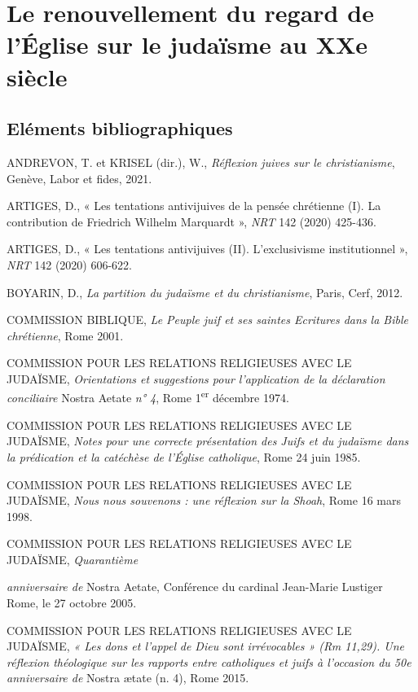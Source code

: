 
\chapter{Le renouvellement du regard de l'Église sur le judaïsme au XXe siècle}

\hypertarget{eluxe9ments-bibliographiques}{%
\section{Eléments bibliographiques}\label{eluxe9ments-bibliographiques}}


ANDREVON, T. et KRISEL (dir.), W., \emph{Réflexion juives sur le
christianisme}, Genève, Labor et fides, 2021.

ARTIGES, D., « Les tentations antivijuives de la pensée chrétienne (I).
La contribution de Friedrich Wilhelm Marquardt », \emph{NRT} 142 (2020)
425-436.

ARTIGES, D., « Les tentations antivijuives (II). L'exclusivisme
institutionnel », \emph{NRT} 142 (2020) 606-622.

BOYARIN, D., \emph{La partition du judaïsme et du christianisme}, Paris,
Cerf, 2012.

COMMISSION BIBLIQUE, \emph{Le Peuple juif et ses saintes Ecritures dans
la Bible chrétienne}, Rome 2001.

COMMISSION POUR LES RELATIONS RELIGIEUSES AVEC LE JUDAÏSME,
\emph{Orientations et}
\emph{suggestions pour l'application de la déclaration conciliaire}
Nostra Aetate \emph{n° 4}, Rome 1\textsuperscript{er} décembre 1974.

COMMISSION POUR LES RELATIONS RELIGIEUSES AVEC LE JUDAÏSME, \emph{Notes
pour une}
\emph{correcte présentation des Juifs et du judaïsme dans la prédication
et la catéchèse de l'Église catholique}, Rome 24 juin 1985.

COMMISSION POUR LES RELATIONS RELIGIEUSES AVEC LE JUDAÏSME, \emph{Nous
nous souvenons : une réflexion sur la Shoah}, Rome 16 mars 1998.

COMMISSION POUR LES RELATIONS RELIGIEUSES AVEC LE JUDAÏSME,
\emph{Quarantième}

\emph{anniversaire de} Nostra Aetate, Conférence du cardinal Jean-Marie
Lustiger Rome, le 27 octobre 2005.

COMMISSION POUR LES RELATIONS RELIGIEUSES AVEC LE JUDAÏSME, \emph{« Les
dons et l'appel}
\emph{de Dieu sont irrévocables » (Rm 11,29). Une réflexion théologique
sur les rapports entre catholiques et juifs à l'occasion du 50e
anniversaire de} Nostra ætate (n. 4), Rome 2015.

